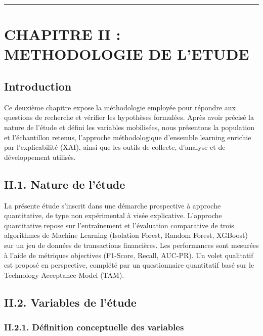 \documentclass[
  12pt,
]{article}
\begin{document}
\begin{center}\rule{0.5\linewidth}{0.5pt}\end{center}

\section{CHAPITRE II : METHODOLOGIE DE
L’ETUDE}\label{chapitre-ii-methodologie-de-letude}

\subsection{Introduction}\label{introduction-1}

Ce deuxième chapitre expose la méthodologie employée pour répondre aux
questions de recherche et vérifier les hypothèses formulées. Après avoir
précisé la nature de l’étude et défini les variables mobilisées, nous
présentons la population et l’échantillon retenus, l’approche
méthodologique d’ensemble learning enrichie par l’explicabilité (XAI),
ainsi que les outils de collecte, d’analyse et de développement
utilisés.

\subsection{II.1. Nature de l’étude}\label{ii.1.-nature-de-luxe9tude}

La présente étude s’inscrit dans une démarche prospective à approche
quantitative, de type non expérimental à visée explicative. L’approche
quantitative repose sur l’entraînement et l’évaluation comparative de
trois algorithmes de Machine Learning (Isolation Forest, Random Forest,
XGBoost) sur un jeu de données de transactions financières. Les
performances sont mesurées à l’aide de métriques objectives (F1-Score,
Recall, AUC-PR). Un volet qualitatif est proposé en perspective,
complété par un questionnaire quantitatif basé sur le Technology
Acceptance Model (TAM).

\subsection{II.2. Variables de
l’étude}\label{ii.2.-variables-de-luxe9tude}

\subsubsection{II.2.1. Définition conceptuelle des
variables}\label{ii.2.1.-duxe9finition-conceptuelle-des-variables}
\end{document}
